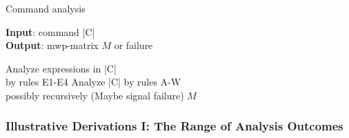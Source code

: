 \begin{algorithm}
\caption{Command analysis}\label{alg:comms}
\textbf{Input}: command \pr|C| \\
\textbf{Output}: mwp-matrix \(M\) or failure
\begin{algorithmic}[1]
\State Analyze expressions in \pr|C| \\ \hspace{1em}by rules E1-E4
\State Analyze \pr|C| by rules A-W \\ \hspace{1em}possibly recursively
\State (Maybe signal failure)
\State \Return \(M\) 
\end{algorithmic}
\end{algorithm}

\subsubsection{Illustrative Derivations I: The Range of Analysis Outcomes}\label{mwp-derivations}

